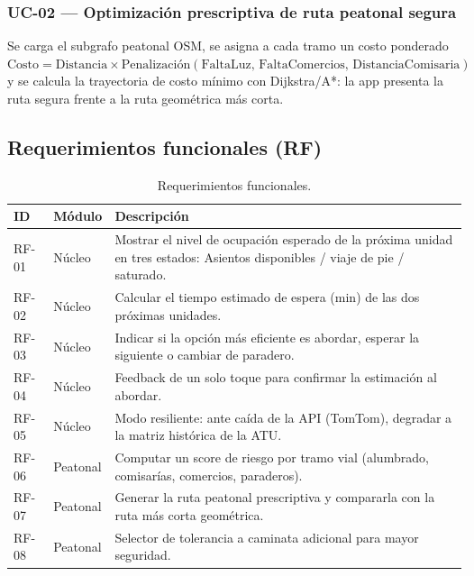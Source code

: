 \documentclass[11pt]{article}
\begin{document}
\subsubsection{UC-02 --- Optimización prescriptiva de ruta peatonal segura}
Se carga el subgrafo peatonal OSM, se asigna a cada tramo un costo ponderado
$\text{Costo} = \text{Distancia} \times \text{Penalización}(\text{FaltaLuz},\,\text{FaltaComercios},\,
\text{DistanciaComisaria})$ y se calcula la trayectoria de costo mínimo con Dijkstra/A*: la app
presenta la ruta segura frente a la ruta geométrica más corta.

\subsection{Requerimientos funcionales (RF)}
\begin{table}[H]
\centering
\caption{Requerimientos funcionales.}
\label{tab:rf}
\begin{tabularx}{\textwidth}{ll>{\raggedright\arraybackslash}X}
\toprule
\textbf{ID} & \textbf{Módulo} & \textbf{Descripción} \\
\midrule
RF-01 & Núcleo & Mostrar el nivel de ocupación esperado de la próxima unidad en tres estados:
Asientos disponibles / viaje de pie / saturado. \\
RF-02 & Núcleo & Calcular el tiempo estimado de espera (min) de las dos próximas unidades. \\
RF-03 & Núcleo & Indicar si la opción más eficiente es abordar, esperar la siguiente o cambiar de paradero. \\
RF-04 & Núcleo & Feedback de un solo toque para confirmar la estimación al abordar. \\
RF-05 & Núcleo & Modo resiliente: ante caída de la API (TomTom), degradar a la matriz histórica de la ATU. \\
RF-06 & Peatonal & Computar un score de riesgo por tramo vial (alumbrado, comisarías, comercios, paraderos). \\
RF-07 & Peatonal & Generar la ruta peatonal prescriptiva y compararla con la ruta más corta geométrica. \\
RF-08 & Peatonal & Selector de tolerancia a caminata adicional para mayor seguridad. \\
\bottomrule
\end{tabularx}
\end{table}
\end{document}

